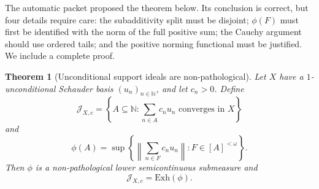 \documentclass[11pt]{article}
\newtheorem{theorem}{Theorem}[section]
\theoremstyle{definition}
\theoremstyle{remark}
\newcommand{\N}{\mathbb N}
\newcommand{\J}{\mathcal J}
\newcommand{\Exh}{\mathrm{Exh}}
\begin{document}
The automatic packet proposed the theorem below.  Its conclusion is correct,
but four details require care: the subadditivity split must be disjoint;
$\phi(F)$ must first be identified with the norm of the full positive sum; the
Cauchy argument should use ordered tails; and the positive norming functional
must be justified.  We include a complete proof.

\begin{theorem}[Unconditional support ideals are non-pathological]
\label{thm:unconditional-support}
Let $X$ have a $1$-unconditional Schauder basis $(u_n)_{n\in\N}$, and let
$c_n>0$.  Define
\[
 \J_{X,c}=\left\{A\subseteq\N:
                  \sum_{n\in A}c_nu_n\text{ converges in }X\right\}
\]
and
\begin{equation}\label{eq:phi-support}
 \phi(A)=\sup\left\{
   \left\|\sum_{n\in F}c_nu_n\right\|:F\in[A]^{<\omega}\right\}.
\end{equation}
Then $\phi$ is a non-pathological lower semicontinuous submeasure and
\[
 \J_{X,c}=\Exh(\phi).
\]
\end{theorem}
\end{document}

